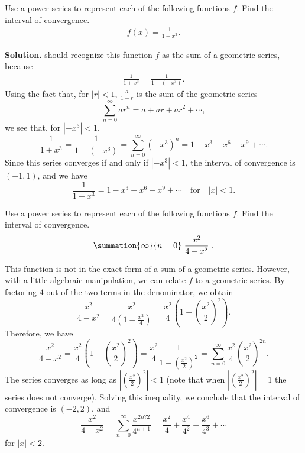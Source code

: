 \documentclass{report}
\begin{document}
    \bigbreak \noindent 
    \begin{eg}
       Use a power series to represent each of the following functions  $f$. Find the interval of convergence. 
       \begin{align*}
           f(x) = \frac{1}{1+x^{3}}
       .\end{align*}
    \end{eg}
    \bigbreak \noindent 
    \textbf{Solution.} should recognize this function $f$ as the sum of a geometric series, because
    \begin{align*}
        \frac{1}{1+x^{3}} = \frac{1}{1-(-x^{3})}
    .\end{align*}
    Using the fact that, for \( |r| < 1 \), \(\frac{a}{1 - r}\) is the sum of the geometric series
\[
    \sum_{n=0}^{\infty} ar^n = a + ar + ar^2 + \cdots,
\]
we see that, for \( \left| -x^3 \right| < 1 \),
\[
    \frac{1}{1 + x^3} = \frac{1}{1 - (-x^3)} = \sum_{n=0}^{\infty} (-x^3)^n = 1 - x^3 + x^6 - x^9 + \cdots.
\]
Since this series converges if and only if \( \left| -x^3 \right| < 1 \), the interval of convergence is \( (-1, 1) \), and we have
\[
    \frac{1}{1 + x^3} = 1 - x^3 + x^6 - x^9 + \cdots \quad \text{for} \quad |x| < 1.
\]


    \pagebreak \bigbreak \noindent 
    \begin{eg}
       Use a power series to represent each of the following functions  $f$. Find the interval of convergence. 
       \begin{align*}
           \summation{\infty}{n=0}\ \frac{x^{2}}{4-x^{2}}\ 
       .\end{align*}
    \end{eg}
    \bigbreak \noindent 
    This function is not in the exact form of a sum of a geometric series. However, with a little algebraic manipulation, we can relate \( f \) to a geometric series. By factoring \( 4 \) out of the two terms in the denominator, we obtain
    \[
        \frac{x^2}{4 - x^2} = \frac{x^2}{4(1 - \frac{x^2}{4})} = \frac{x^2}{4}\left(1 - \left(\frac{x^2}{2}\right)^2\right).
    \]
    \bigbreak \noindent 
    Therefore, we have
    \[
        \frac{x^2}{4 - x^2} = \frac{x^2}{4}\left(1 - \left(\frac{x^2}{2}\right)^2\right) = \frac{x^2}{4}\frac{1}{1 - \left(\frac{x^2}{2}\right)^2} = \sum_{n=0}^{\infty} \frac{x^2}{4}\left(\frac{x^2}{2}\right)^{2n}.
    \]
    \bigbreak \noindent 
    The series converges as long as \( \left|\left(\frac{x^2}{2}\right)^2\right| < 1 \) (note that when \( \left|\left(\frac{x^2}{2}\right)^2\right| = 1 \) the series does not converge). Solving this inequality, we conclude that the interval of convergence is \( (-2, 2) \), and
    \[
        \frac{x^2}{4 - x^2} = \sum_{n=0}^{\infty} \frac{x^{2n?2}}{4^{n+1}} = \frac{x^2}{4} + \frac{x^4}{4^2} + \frac{x^6}{4^3} + \cdots
    \]
    \bigbreak \noindent 
    for \( |x| < 2 \).

        
        


    


    
    
    
    
\end{document}
